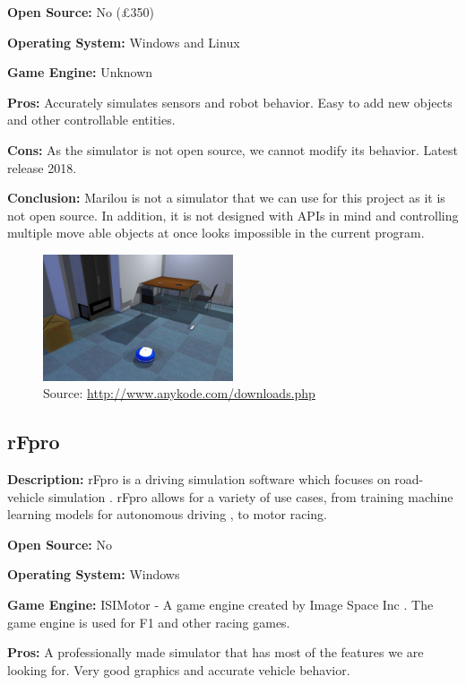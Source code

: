\textbf{Open Source:} No (£350)

\textbf{Operating System:} Windows and Linux

\textbf{Game Engine:} Unknown

\textbf{Pros:} Accurately simulates sensors and robot behavior. Easy to add new objects and other controllable entities. 

\textbf{Cons:} As the simulator is not open source, we cannot modify its behavior. Latest release 2018.

\textbf{Conclusion:} Marilou is not a simulator that we can use for this project as it is not open source. In addition, it is not designed with APIs in mind and controlling multiple move able objects at once looks impossible in the current program. 

\begin{figure}[H]
    \centering
    \includegraphics[width=0.5\textwidth]{Simulators/Marilou.jpg}
    \caption{Source: \url{http://www.anykode.com/downloads.php}}
\end{figure}


\subsection{rFpro}
\textbf{Description:} rFpro is a driving simulation software which focuses on road-vehicle simulation \cite{rFpro_Web}. rFpro allows for a variety of use cases, from training machine learning models for autonomous driving \cite{rFpro_ML}, to motor racing.

\textbf{Open Source:} No

\textbf{Operating System:} Windows

\textbf{Game Engine:} ISIMotor - A game engine created by Image Space Inc \cite{ISIMotor}. The game engine is used for F1 and other racing games.

\textbf{Pros:} A professionally made simulator that has most of the features we are looking for. Very good graphics and accurate vehicle behavior. 

